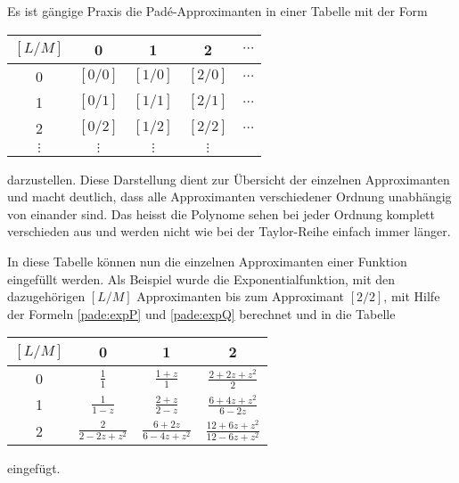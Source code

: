 Es ist gängige Praxis die Padé-Approximanten in einer Tabelle mit der Form
\begin{center}
	\begin{tabular}{c| c c c c}
		
		$[L/M]$ 	& 0 		& 1 		& 2 		& $\cdots$ \\
		\hline
		0 		& $[0/0]$ 	& $[1/0]$ 	& $[2/0]$ 	& $\dots$ \\
		1 		& $[0/1]$ 	& $[1/1]$ 	& $[2/1]$ 	& $\dots$ \\
		2 		& $[0/2]$ 	& $[1/2]$ 	& $[2/2]$ 	& $\dots$ \\
		$\vdots$ 	& $\vdots$ 	& $\vdots$  	& $\vdots$  	&  \\
	\end{tabular}
\end{center}
darzustellen.
Diese Darstellung dient zur Übersicht der einzelnen Approximanten und macht deutlich, dass alle Approximanten verschiedener Ordnung unabhängig von einander sind. 
Das heisst die Polynome sehen bei jeder Ordnung komplett verschieden aus und werden nicht wie bei der Taylor-Reihe einfach immer länger. 


In diese Tabelle können nun die einzelnen Approximanten einer Funktion eingefüllt werden.
Als Beispiel wurde die Exponentialfunktion, mit den dazugehörigen $[L/M]$ Approximanten bis zum Approximant $[2/2]$, mit Hilfe der Formeln \ref{pade:expP} und \ref{pade:expQ} berechnet und in die Tabelle
\begin{table}
\centering
\renewcommand\arraystretch{1.25}
	\begin{tabular}{c| c c c }
		$[L/M]$ 	& 0 		& 1 		& 2 	 \\
		\hline
		0 		&  $\displaystyle\frac{1}{1}$ 	& $\displaystyle\frac{1+z}{1}$ 	& $\displaystyle\frac{2+2 z+z^{2}}{2}$ \\
		1 		& $\displaystyle \frac{1}{1-z}$ 	& $\displaystyle\frac{2+z}{2-z}$ 	& $\displaystyle\frac{6+4 z+z^{2}}{6-2 z}$ 	 \\
		2 		& $\displaystyle\frac{2}{2-2 z+z^{2}} $ 	& $\displaystyle\frac{6+2 z}{6-4 z+z^{2}}$ 	& $\displaystyle\frac{12+6 z+z^{2}}{12-6 z+z^{2}}$ 	 \\
	\end{tabular}
\end{table}
eingefügt.













